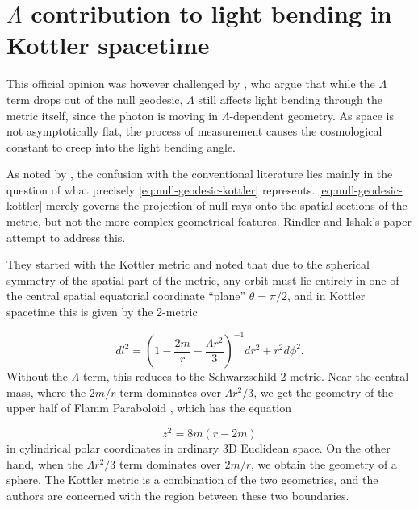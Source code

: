 \section{$\Lambda$ contribution to light bending in Kottler spacetime}\label{section:kottler}

This official opinion was however challenged by \citet{Rindler2007}, who argue that while the $\Lambda$ term drops out of the null geodesic, $\Lambda$ still affects light bending through the metric itself, since the photon is moving in $\Lambda$-dependent geometry. As space is not asymptotically flat, the process of measurement causes the cosmological constant to creep into the light bending angle. 

As noted by \citet{Gibbons2008}, the confusion with the conventional literature lies mainly in the question of what precisely \eqref{eq:null-geodesic-kottler} represents. \eqref{eq:null-geodesic-kottler} merely governs the projection of null rays onto the spatial sections of the metric, but not the more complex geometrical features. Rindler and Ishak's paper attempt to address this. 

They started with the Kottler metric and noted that due to the spherical symmetry of the spatial part of the metric, any orbit must lie entirely in one of the central spatial equatorial coordinate ``plane'' $\theta = \pi / 2$, and in Kottler spacetime this is given by the 2-metric

\begin{equation}
  dl^2 = \left ( 1 - \frac{2m}{r} - \frac{\Lambda r^2}{3}\right )^{-1} dr^2 + r^2 d \phi^2. 
\end{equation}
Without the $\Lambda$ term, this reduces to the Schwarzschild 2-metric. Near the central mass, where the $2m/r$ term dominates over $\Lambda r^2 / 3$, we get the geometry of the upper half of Flamm Paraboloid \citep{Flamm1916}, which has the equation

\begin{equation}
  z^2 = 8m (r - 2m)
\end{equation}
in cylindrical polar coordinates in ordinary 3D Euclidean space. On the other hand, when the $\Lambda r^2 / 3$ term dominates over $2m/r$, we obtain the geometry of a sphere. The Kottler metric is a combination of the two geometries, and the authors are concerned with the region between these two boundaries. 

